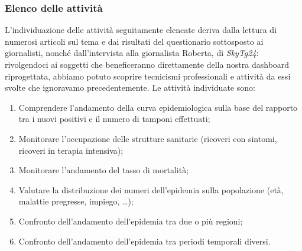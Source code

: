 \subsubsection{Elenco delle attività}
L'individuazione delle attività seguitamente elencate deriva dalla lettura di numerosi articoli sul tema e dai risultati del questionario sottosposto ai giornalisti, nonché dall'intervista alla giornalista Roberta, di \textit{SkyTg24}: rivolgendoci ai soggetti che beneficeranno direttamente della nostra dashboard riprogettata, abbiamo potuto scoprire tecnicismi professionali e attività da essi svolte che ignoravamo precedentemente.
\noindent
Le attività individuate sono:
\begin{enumerate}[label=\textit{\arabic*}]
    \item Comprendere l'andamento della curva epidemiologica sulla base del rapporto tra i nuovi positivi e il numero di tamponi effettuati;\label{itm:1}
    \item Monitorare l'occupazione delle strutture sanitarie (ricoveri con sintomi, ricoveri in terapia intensiva);\label{itm:2}
    \item Monitorare l'andamento del tasso di mortalità;\label{itm:3}
    \item Valutare la distribuzione dei numeri dell'epidemia sulla popolazione (età, malattie pregresse, impiego, …);\label{itm:4}
    \item Confronto dell'andamento dell'epidemia tra due o più regioni;\label{itm:5}
    \item Confronto dell'andamento dell'epidemia tra periodi temporali diversi.\label{itm:6}
\end{enumerate}

